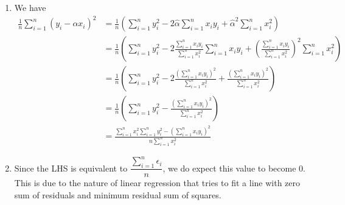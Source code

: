 \documentclass{article}
\begin{document}
\begin{enumerate}
\begin{enumerate}
        \item We have
        \begin{align*}
            \frac{1}{n}\sum_{i=1}^{n}(y_i-\alpha x_i)^2 &= \frac{1}{n}\left(\sum_{i=1}^{n}y_i^2-2\hat{\alpha}\sum_{i=1}^{n}x_iy_i+\hat{\alpha}^2\sum_{i=1}^{n}x_i^2\right)\\
            &= \frac{1}{n}\left(\sum_{i=1}^{n}y_i^2-2\frac{\sum_{i=1}^{n} x_iy_i}{\sum_{i=1}^{n} x_i^2}\sum_{i=1}^{n}x_iy_i+\left(\frac{\sum_{i=1}^{n} x_iy_i}{\sum_{i=1}^{n} x_i^2}\right)^2\sum_{i=1}^{n}x_i^2\right)\\
            &= \frac{1}{n}\left(\sum_{i=1}^{n}y_i^2-2\frac{\left(\sum_{i=1}^{n} x_iy_i\right)^2}{\sum_{i=1}^{n} x_i^2}+\frac{\left(\sum_{i=1}^{n} x_iy_i\right)^2}{\sum_{i=1}^{n} x_i^2}\right)\\
            &= \frac{1}{n}\left(\sum_{i=1}^{n}y_i^2-\frac{\left(\sum_{i=1}^{n} x_iy_i\right)^2}{\sum_{i=1}^{n} x_i^2}\right)\\
            &= \frac{\sum_{i=1}^{n} x_i^2\sum_{i=1}^{n}y_i^2-\left(\sum_{i=1}^{n} x_iy_i\right)^2}{n\sum_{i=1}^{n} x_i^2}
        \end{align*}
        
        \item
        Since the LHS is equivalent to $\dfrac{\sum_{i=1}^{n} \epsilon_i}{n}$, we do expect this value to become 0. This is due to the nature of linear regression that tries to fit a line with zero sum of residuals and minimum residual sum of squares.
    \end{enumerate}
    

\end{enumerate}
\end{document}
